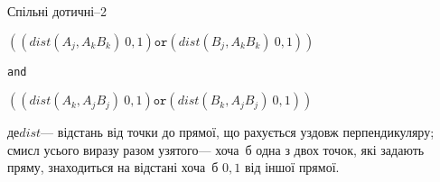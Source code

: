 \begin{problemAllDefault}{Спільні дотичні--2}
\begin{small}
\begin{enumerate}
\begin{center}

\vspace{-\baselineskip}

$({(dist(A_j,A_kB_k)\>0{,}1)}\texttt{or}{(dist(B_j,A_kB_k)\>0{,}1)})$

\texttt{and}

$({(dist(A_k,A_jB_j)\>0{,}1)}\texttt{or}{(dist(B_k,A_jB_j)\>0{,}1)})$

\vspace{-\baselineskip}

\end{center}

\noindent%
де\nolinebreak[3] $dist$\nolinebreak[3] --- відстань від точки до прямої, що рахується уздовж перпендикуляру; смисл усього виразу разом узятого\nolinebreak[3] --- хоча~б одна з двох точок, які задають пряму, знаходиться на відстані хоча~б $0{,}1$ від іншої прямої.

\end{enumerate}


\Example

\noindent
\begin{exampleSimple}{7em}{28em}
%
\end{exampleSimple}


\end{small}

\end{problemAllDefault}